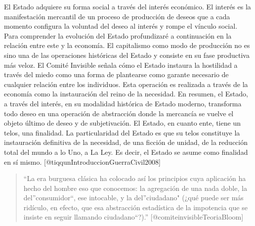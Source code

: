 \documentclass[
]{article}
\begin{document}
El Estado adquiere su forma social a través del interés económico. El
interés es la manifestación mercantil de un proceso de producción de
deseos que a cada momento configura la voluntad del deseo al interés y
rompe el vínculo social. Para comprender la evolución del Estado
profundizaré a continuación en la relación entre este y la economía. El
capitalismo como modo de producción no es sino una de las operaciones
históricas del Estado y consiste en su fase productiva más veloz. El
Comité Invisible señala cómo el Estado instaura la hostilidad a través
del miedo como una forma de plantearse como garante necesario de
cualquier relación entre los individuos. Esta operación es realizada a
través de la economía como la instauración del reino de la necesidad. En
resumen, el Estado, a través del interés, en su modalidad histórica de
Estado moderno, transforma todo deseo en una operación de abstracción
donde la mercancía se vuelve el objeto último de deseo y de
subjetivación. El Estado, en cuanto ente, tiene un telos, una finalidad.
La particularidad del Estado es que su telos constituye la instauración
definitiva de la necesidad, de una ficción de unidad, de la reducción
total del mundo a lo Uno, a La Ley. Es decir, el Estado se asume como
finalidad en sí mismo. {[}@tiqqunIntroduccionGuerraCivil2008{]}

\begin{quote}
``La era burguesa clásica ha colocado así los principios cuya aplicación
ha hecho del hombre eso que conocemos: la agregación de una nada doble,
la del''consumidor``, ese intocable, y la del''ciudadano" (¿qué puede
ser más ridículo, en efecto, que esa abstracción estadística de la
impotencia que se insiste en seguir llamando ciudadano``?).''
{[}@comiteinvisibleTeoriaBloom{]}
\end{quote}
\end{document}
